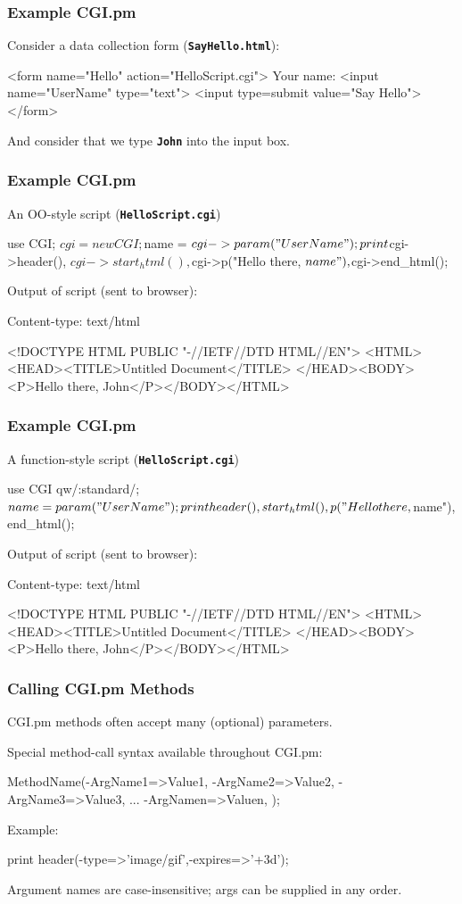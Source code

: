 \begin{frame}[fragile]
\frametitle{Example CGI.pm}
Consider a data collection form (\textbf{\tt{SayHello.html}}):
\begin{perl}
    <form name="Hello" action="HelloScript.cgi">
    Your name: <input name="UserName" type="text">
    <input type=submit value="Say Hello">
    </form>
\end{perl}

And consider that we type \textbf{\tt{John}} into the input box.
\end{frame}

\begin{frame}[fragile]
\frametitle{Example CGI.pm}
An OO-style script (\textbf{\tt{HelloScript.cgi}})
\begin{perl}
use CGI;
$cgi = new CGI;
$name = $cgi->param("UserName");
print $cgi->header(), $cgi->start_html(),
      $cgi->p("Hello there, $name"),
      $cgi->end_html();
\end{perl}

Output of script (sent to browser):
\begin{perl}
Content-type: text/html

<!DOCTYPE HTML PUBLIC "-//IETF//DTD HTML//EN">
<HTML><HEAD><TITLE>Untitled Document</TITLE>
</HEAD><BODY><P>Hello there, John</P></BODY></HTML>
\end{perl}

\end{frame}

\begin{frame}[fragile]
\frametitle{Example CGI.pm}
A function-style script (\textbf{\tt{HelloScript.cgi}})
\begin{perl}
use CGI qw/:standard/;
$name = param("UserName");
print header(), start_html(),
      p("Hello there, $name"),
      end_html();
\end{perl}

Output of script (sent to browser):
\begin{perl}
Content-type: text/html

<!DOCTYPE HTML PUBLIC "-//IETF//DTD HTML//EN">
<HTML><HEAD><TITLE>Untitled Document</TITLE>
</HEAD><BODY><P>Hello there, John</P></BODY></HTML>
\end{perl}

\end{frame}

\begin{frame}[fragile]
\frametitle{Calling CGI.pm Methods}
CGI.pm methods often accept many (optional) parameters.

Special method-call syntax available throughout CGI.pm:
\begin{perl}
    MethodName(-ArgName1=>Value1,
               -ArgName2=>Value2,
               -ArgName3=>Value3,
               ...
               -ArgNamen=>Valuen,
               );
\end{perl}

Example:
\begin{perl}
    print header(-type=>'image/gif',-expires=>'+3d');
\end{perl}

Argument names are case-insensitive; args can be supplied in any order.
\end{frame}

